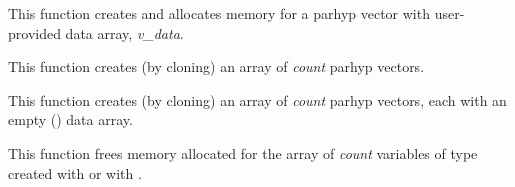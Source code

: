 \documentclass[letterpaper,10pt,english]{sphinxmanual}
\begin{document}

\begin{fulllineitems}
\label{nvectors/NVector_ParHyp:c.N_VMake_ParHyp}
This function creates and allocates memory for a parhyp vector with
user-provided data array, \emph{v\_data}.

\end{fulllineitems}


\begin{fulllineitems}
\label{nvectors/NVector_ParHyp:c.N_VCloneVectorArray_ParHyp}
This function creates (by cloning) an array of \emph{count} parhyp
vectors.

\end{fulllineitems}


\begin{fulllineitems}
\label{nvectors/NVector_ParHyp:c.N_VCloneEmptyVectorArray_ParHyp}
This function creates (by cloning) an array of \emph{count} parhyp
vectors, each with an empty () data array.

\end{fulllineitems}


\begin{fulllineitems}
\label{nvectors/NVector_ParHyp:c.N_VDestroyVectorArray_ParHyp}
This function frees memory allocated for the array of \emph{count}
variables of type  created with
{\hyperref[nvectors/NVector_ParHyp:c.N_VCloneVectorArray_ParHyp]{\emph{}}} or with
{\hyperref[nvectors/NVector_ParHyp:c.N_VCloneEmptyVectorArray_ParHyp]{\emph{}}}.

\end{fulllineitems}
\end{document}
